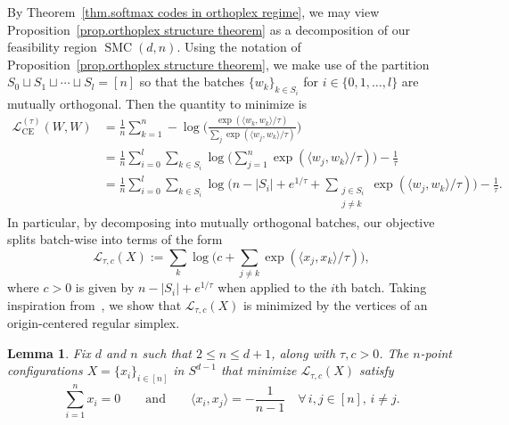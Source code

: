 \documentclass{article}
\theoremstyle{plain}
\newtheorem{lemma}[theorem]{Lemma}
\theoremstyle{definition}
\begin{document}
By Theorem~\ref{thm.softmax codes in orthoplex regime}, we may view Proposition~\ref{prop.orthoplex structure theorem} as a decomposition of our feasibility region $\operatorname{SMC}(d,n)$.
Using the notation of Proposition~\ref{prop.orthoplex structure theorem}, we make use of the partition $S_0\sqcup S_1\sqcup\cdots\sqcup S_l=[n]$ so that the batches $\{w_k\}_{k\in S_i}$ for $i\in\{0,1,\ldots,l\}$ are mutually orthogonal.
Then the quantity to minimize is
\begin{align*}
\mathcal{L}_{\operatorname{CE}}^{(\tau)}(W,W)
&=\frac{1}{n}\sum_{k=1}^{n} -\log \bigg( \frac{\exp(\langle w_k, w_k\rangle/\tau)  }{\sum_{j} \exp(\langle w_j, w_k\rangle/\tau)  } \bigg)\\
&=\frac{1}{n}\sum_{i=0}^{l}\sum_{k\in S_i} \log \bigg( \sum_{j=1}^n \exp(\langle w_j, w_k\rangle/\tau)   \bigg)-\frac{1}{\tau}\\
&=\frac{1}{n}\sum_{i=0}^{l}\sum_{k\in S_i} \log \bigg( n-|S_i|+e^{1/\tau}+\sum_{\substack{j\in S_i\\j\neq k}}\exp(\langle w_j, w_k\rangle/\tau) \bigg)-\frac{1}{\tau}.
\end{align*}
In particular, by decomposing into mutually orthogonal batches, our objective splits batch-wise into terms of the form
\[
\mathcal{L}_{\tau,c}(X)
:=\sum_k\log\bigg(c+\sum_{j\neq k}\exp(\langle x_j, x_k\rangle/\tau)\bigg),
\]
where $c>0$ is given by $n-|S_i|+e^{1/\tau}$ when applied to the $i$th batch.
Taking inspiration from~\cite{lu2022neural}, we show that $\mathcal{L}_{\tau,c}(X)$ is minimized by the vertices of an origin-centered regular simplex.

\begin{lemma}
\label{lem.simplex batches}
Fix $d$ and $n$ such that $2\leq n \leq d+1$, along with $\tau,c>0$.
The $n$-point configurations $X=\{x_i\}_{i\in[n]}$ in $S^{d-1}$ that minimize $\mathcal{L}_{\tau,c}(X)$ satisfy
\[
\sum_{i=1}^n x_i=0
\qquad
\text{and}
\qquad
\langle x_i,x_j\rangle=-\frac{1}{n-1}
\quad \forall\, i,j\in[n],\,i\neq j.
\]
\end{lemma}
\end{document}
